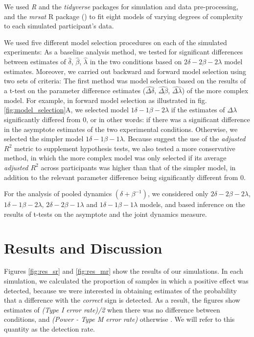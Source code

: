 \documentclass[10pt,letterpaper]{article}
\begin{document}
We used \textit{R} \cite{R-base} and the \textit{tidyverse} packages \cite{R-tidyverse} for simulation and data pre-processing, and the \textit{mrsat} R package () to fit eight models of varying degrees of complexity to each simulated participant's data.

We used five different model selection procedures on each of the simulated experiments:
As a baseline analysis method, we tested for significant differences between estimates of $\hat{\delta}$, $\hat{\beta}$, $\hat{\lambda}$ in the two conditions based on $2\delta-2\beta-2\lambda$ model estimates.
Moreover, we carried out backward and forward model selection using two sets of criteria:
The first method was model selection based on the results of a t-test on the parameter difference estimates ($\hat{\Delta\delta}$, $\hat{\Delta\beta}$, $\hat{\Delta\lambda}$) of the more complex model. For example, in forward model selection as illustrated in fig. \ref{fig:model_selection}A, we selected model $1\delta-1\beta-2\lambda$ if the estimates of $\Delta\lambda$ significantly differed from $0$, or in other words: if there was a significant difference in the asymptote estimates of the two experimental conditions. Otherwise, we selected the simpler model $1\delta-1\beta-1\lambda$.
Because  suggest the use of the \textit{adjusted $R^2$} metric to supplement hypothesis tests, we also tested a more conservative method, in which the more complex model was only selected if its average \textit{adjusted $R^2$} across participants was higher than that of the simpler model, in addition to the relevant parameter difference being significantly different from $0$.

For the analysis of pooled dynamics $(\delta +\beta^{-1})$, we considered only $2\delta-2\beta-2\lambda$, $1\delta-1\beta-2\lambda$, $2\delta-2\beta-1\lambda$ and $1\delta-1\beta-1\lambda$ models, and based inference on the results of t-tests on the asymptote and the joint dynamics measure. 

\section{Results and Discussion}\label{results}

Figures \ref{fig:res_sr} and \ref{fig:res_mr} show the results of our simulations. In each simulation, we calculated the proportion of samples in which a positive effect was detected, because we were interested in obtaining estimates of the probability that a difference with the \textit{correct} sign is detected. As a result, the figures show estimates of \textit{(Type I error rate)/2} when there was no difference between conditions, and \textit{(Power - Type M error rate)} otherwise \cite{gelman2014beyond}. We will refer to this quantity as the detection rate. 
\end{document}

